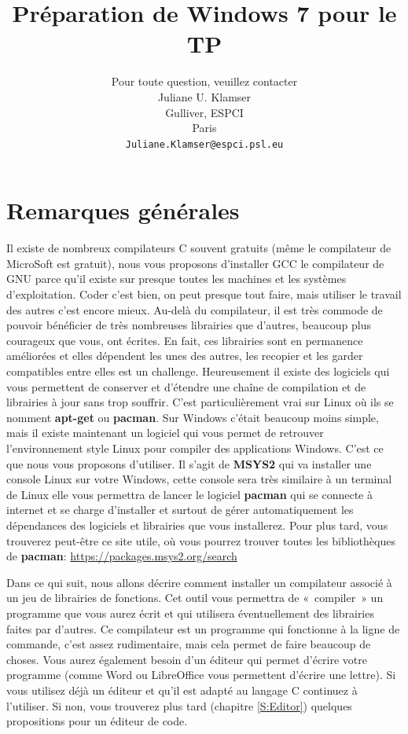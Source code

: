 \documentclass{article}
\title{Préparation de Windows 7 pour le TP}
\author{
Pour toute question, veuillez contacter\\
 Juliane U. Klamser\\%
  Gulliver,  ESPCI\\
  Paris \\
  \texttt{Juliane.Klamser@espci.psl.eu} \\
}
\begin{document}
\maketitle

\tableofcontents



\section{Remarques générales}
Il existe de nombreux compilateurs C souvent gratuits (même le compilateur de MicroSoft est gratuit), nous vous proposons d'installer GCC le compilateur de GNU parce qu'il existe sur presque toutes les machines et les systèmes d'exploitation. Coder c'est bien, on peut presque tout faire, mais utiliser le travail des autres c'est encore mieux. Au-delà du compilateur, il est très commode de pouvoir bénéficier de très nombreuses librairies que d'autres, beaucoup plus courageux que vous, ont écrites. En fait, ces librairies sont en permanence améliorées et elles dépendent les unes des autres, les recopier et les garder compatibles entre elles est un challenge. 
Heureusement il existe des logiciels qui vous permettent de conserver et d'étendre une chaîne de compilation et de librairies à jour sans trop souffrir. C'est particulièrement vrai sur Linux où ils se nomment \textbf{apt-get} ou \textbf{pacman}. Sur Windows c'était beaucoup moins simple, mais il existe maintenant un logiciel qui vous permet de retrouver l’environnement style Linux pour compiler des applications Windows. C'est ce que nous vous proposons d'utiliser. Il s'agit de \textbf{MSYS2} qui va installer une console Linux sur votre Windows, cette console sera très similaire à un terminal de Linux elle vous permettra de lancer le logiciel \textbf{pacman} qui se connecte à internet et se charge d'installer et surtout de gérer automatiquement les dépendances des logiciels et librairies que vous installerez. Pour plus tard, vous trouverez peut-être ce site utile, où vous pourrez trouver toutes les bibliothèques de \textbf{pacman}: \href{https://packages.msys2.org/search}{https://packages.msys2.org/search}

Dans ce qui suit, nous allons décrire comment installer un compilateur associé à un jeu de librairies de fonctions. Cet outil vous permettra de « compiler » un programme que vous aurez écrit et qui utilisera éventuellement des librairies faites par d'autres. Ce compilateur est un programme qui fonctionne à la ligne de commande, c'est assez rudimentaire, mais cela permet de faire beaucoup de choses. Vous aurez également besoin d'un éditeur qui permet d'écrire votre programme (comme Word ou LibreOffice vous permettent d'écrire une lettre). Si vous utilisez déjà un éditeur et qu'il est adapté au langage C continuez à l'utiliser. Si non, vous trouverez plus tard (chapitre \ref{S:Editor}) quelques propositions pour un éditeur de code.
\end{document}
